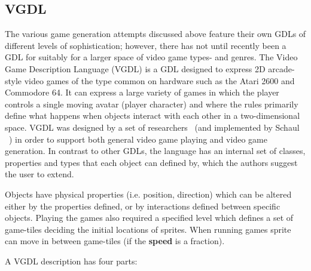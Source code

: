 \documentclass[a4paper,titlepage,final, twoside]{report}
\begin{document}
\subsection{VGDL}
\label{ssec_vgdl}
The various game generation attempts discussed above feature their own GDLs of different levels of sophistication; however, there has not until recently been a GDL for suitably for a larger space of video game types- and genres.
The Video Game Description Language (VGDL) is a GDL designed to express 2D arcade-style video games of the type common on hardware such as the Atari 2600 and Commodore 64. It can express a large variety of games in which the player controls a single moving avatar (player character) and where the rules primarily define what happens when objects interact with each other in a two-dimensional space. VGDL was designed by a set of researchers~\citet{levine2013general,ebner2013towards} (and implemented by Schaul ~\citet{schaul2013video}) in order to support both general video game playing and video game generation.
In contrast to other GDLs, the language has an internal set of classes, properties and types that each object can defined by, which the authors suggest the user to extend.

Objects have physical properties (i.e. position, direction) which can be altered either by the properties defined, or by interactions defined between specific objects. 
Playing the games also required a specified level which defines a set of game-tiles deciding the initial locations of sprites. When running games sprite can move in between game-tiles (if the \textbf{speed} is a fraction).

A VGDL description has four parts: 
\end{document}
